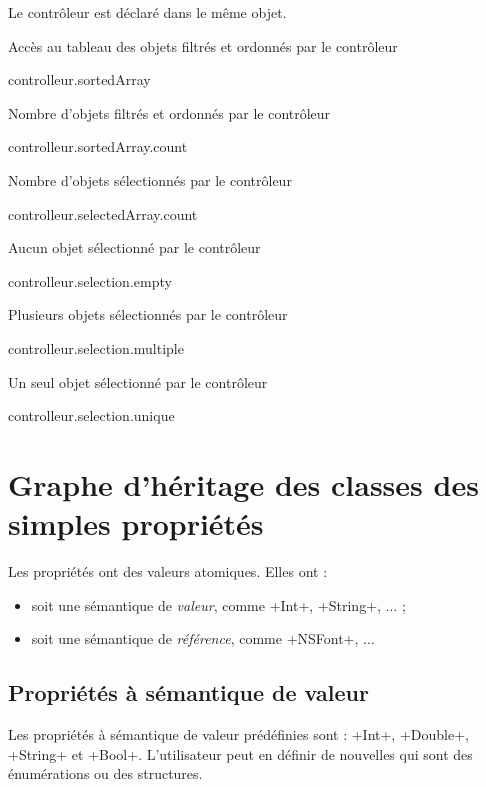 Le contrôleur est déclaré dans le même objet.

Accès au tableau des objets filtrés et ordonnés par le contrôleur
\begin{ebcode}
controlleur.sortedArray
\end{ebcode}

Nombre d'objets filtrés et ordonnés par le contrôleur
\begin{ebcode}
controlleur.sortedArray.count
\end{ebcode}

Nombre d'objets sélectionnés par le contrôleur
\begin{ebcode}
controlleur.selectedArray.count
\end{ebcode}

Aucun objet sélectionné par le contrôleur
\begin{ebcode}
controlleur.selection.empty
\end{ebcode}

Plusieurs objets sélectionnés par le contrôleur
\begin{ebcode}
controlleur.selection.multiple
\end{ebcode}

Un seul objet sélectionné par le contrôleur
\begin{ebcode}
controlleur.selection.unique
\end{ebcode}


\section{Graphe d'héritage des classes des simples propriétés}

Les propriétés ont des valeurs atomiques. Elles ont :
\begin{itemize}
\item soit une sémantique de \emph{valeur}, comme \eb+Int+, \eb+String+, ... ; 
\item soit une sémantique de \emph{référence}, comme \eb+NSFont+, ... 
\end{itemize}

\subsection{Propriétés à sémantique de valeur}

Les propriétés à sémantique de valeur prédéfinies sont : \eb+Int+, \eb+Double+, \eb+String+ et \eb+Bool+. L'utilisateur peut en définir de nouvelles qui sont des énumérations ou des structures.

